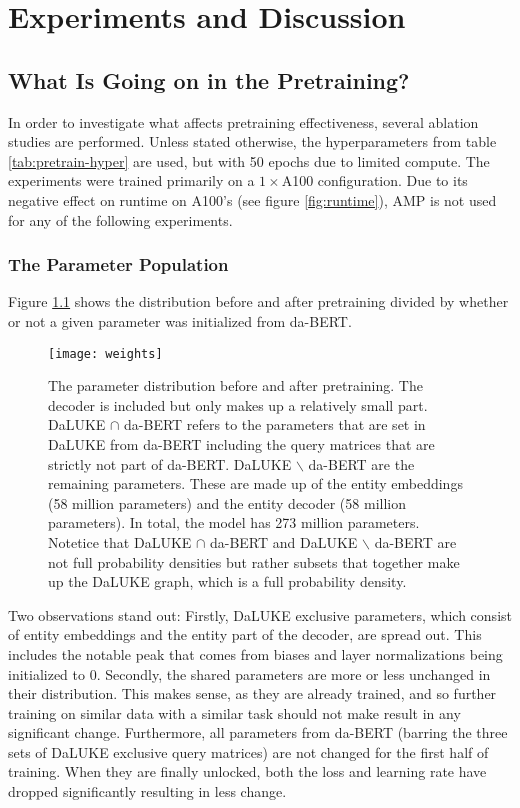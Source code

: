 \documentclass[main.tex]{subfiles}
\begin{document}
\chapter{Experiments and Discussion}
\label{chap:discussion}

\section{What Is Going on in the Pretraining?}
\label{sec:pretrainpls}
In order to investigate what affects pretraining effectiveness, several ablation studies are performed.
Unless stated otherwise, the hyperparameters from table \ref{tab:pretrain-hyper} are used, but with 50 epochs due to limited compute.
The experiments were trained primarily on a $ 1\times$A100 configuration.
Due to its negative effect on runtime on A100's (see figure \ref{fig:runtime}), AMP is not used for any of the following experiments.
\subsection{The Parameter Population}
Figure \ref{fig:weight-dist} shows the distribution before and after pretraining divided by whether or not a given parameter was initialized from da-BERT.
\begin{figure}[H]
    \centering
    \texttt{[image: weights]}
    \caption{
        The parameter distribution before and after pretraining.
        The decoder is included but only makes up a relatively small part.
        DaLUKE $ \cap $ da-BERT refers to the parameters that are set in DaLUKE from da-BERT including the query matrices that are strictly not part of da-BERT.
        DaLUKE $ \backslash $ da-BERT are the remaining parameters.
        These are made up of the entity embeddings (58 million parameters) and the entity decoder (58 million parameters).
        In total, the model has 273 million parameters.
        Notetice that DaLUKE $ \cap $ da-BERT and DaLUKE $ \backslash $ da-BERT are not full probability densities but rather subsets that together make up the DaLUKE graph, which is a full probability density.
    }
    \label{fig:weight-dist}
\end{figure}\noindent
Two observations stand out:
Firstly, DaLUKE exclusive parameters, which consist of entity embeddings and the entity part of the decoder, are spread out.
This includes the notable peak that comes from biases and layer normalizations being initialized to 0.
Secondly, the shared parameters are more or less unchanged in their distribution.
This makes sense, as they are already trained, and so further training on similar data with a similar task should not make result in any significant change.
Furthermore, all parameters from da-BERT (barring the three sets of DaLUKE exclusive query matrices) are not changed for the first half of training.
When they are finally unlocked, both the loss and learning rate have dropped significantly resulting in less change.
\end{document}
